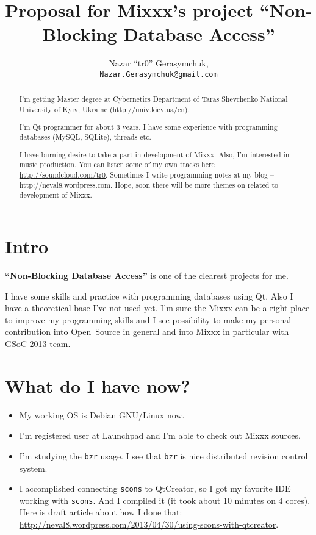 \documentclass[a4paper,12pt]{scrartcl}
\title{Proposal for Mixxx's project ``Non-Blocking Database Access''}
\author{Nazar ``tr0'' Gerasymchuk, \\ \texttt{\normalsize Nazar.Gerasymchuk@gmail.com}}
\begin{document}
\maketitle
\begin{abstract}
I'm getting Master degree at Cybernetics Department of Taras Shevchenko National
University of Kyiv, Ukraine (\url{http://univ.kiev.ua/en}).

I'm Qt programmer for about 3 years. I have some experience with programming databases 
(MySQL, SQLite), threads etc.

I have burning desire to take a part in development of Mixxx. Also, I'm interested in music 
production. You can listen some of my own tracks here -- \url{http://soundcloud.com/tr0}.
Sometimes I write programming notes at my blog -- \url{http://neval8.wordpress.com}. 
Hope, soon there will be more themes on related to development of Mixxx.
\end{abstract}

\tableofcontents

\newpage
\section{Intro}

\textbf{``Non-Blocking Database Access''} is one of the clearest projects for me.

I have some skills and practice with programming databases using Qt. Also I have a theoretical base 
I've not used yet. I'm sure the Mixxx can be a right place to improve my programming skills and 
I see possibility to make my personal contribution into Open~Source in general and into 
Mixxx in particular with GSoC 2013 team.

\section{What do I have now?}
\begin{itemize}
 \item My working OS is Debian GNU/Linux now.
 \item I'm registered user at Launchpad and I'm able to check out Mixxx sources.
 \item I'm studying the \texttt{bzr} usage. I see that \texttt{bzr} is nice distributed revision 
    control system.
 \item I accomplished connecting \texttt{scons} to QtCreator, so I got my favorite IDE working 
    with \texttt{scons}. And I compiled it (it took about 10 minutes on 4 cores). Here is 
    draft article about how I done that: \\ \url{http://neval8.wordpress.com/2013/04/30/using-scons-with-qtcreator}.
\end{itemize}
\end{document}
